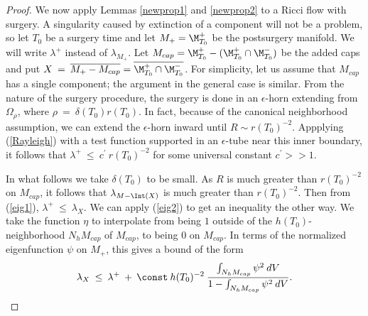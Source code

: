 \begin{proof}
We now apply Lemmas \ref{newprop1} and \ref{newprop2}
to a Ricci flow with surgery.
A singularity caused by extinction of a component will not be a
problem, so
let $T_0$ be a surgery time  and let
$M_+ = \M_{T_0}^+$ be the postsurgery manifold.  We will write
$\lambda^+$ instead of $\lambda_{M_+}$. Let $M_{cap} =
\M_{T_0}^+ - (\M_{T_0}^+ \cap \M_{T_0}^-)$ be the added
caps and put $X \: = \: \overline{M_+ - M_{cap}} =
\overline{\M_{T_0}^+ \cap \M_{T_0}^-}$.
For simplicity,
let us assume that $M_{cap}$ has a single component; the argument in
the general case is similar.
From the nature of the surgery procedure, the surgery is done in an
$\epsilon$-horn extending from $\Omega_\rho$, where
$\rho \: = \: \delta(T_0) r(T_0)$.
In fact, because of the canonical
neighborhood assumption, we can extend the $\epsilon$-horn inward
until $R \sim r(T_0)^{-2}$. Appplying (\ref{Rayleigh}) with a test function
supported in an $\epsilon$-tube near this inner boundary, it follows that
$\lambda^+ \: \le \: c^\prime \: r(T_0)^{-2}$ for some universal constant
$c^\prime >> 1$.


In what follows we take $\delta(T_0)$ to be small.
As $R$ is much greater than $r(T_0)^{-2}$ on $M_{cap}$, it follows that
$\lambda_{M - \Int(X)}$ is much greater than $r(T_0)^{-2}$. Then from
(\ref{eig1}), $\lambda^+ \: \le \: \lambda_X$. We can apply
(\ref{eig2}) to get an inequality the other way.
We take the function $\eta$ to interpolate from being $1$ outside of the
$h(T_0)$-neighborhood
$N_h M_{cap}$ of $M_{cap}$, to being $0$ on $M_{cap}$.
In terms of the normalized eigenfunction $\psi$ on $M_+$,
this gives a bound of the form
\begin{equation} \label{bound11}
\lambda_X \: \le \: \lambda^+ \: + \: \const \: h(T_0)^{-2} \:
\frac{\int_{N_h M_{cap}} \psi^2 \: dV}{1 - \int_{N_h M_{cap}} \psi^2 \: dV}.
\end{equation}


\end{proof}
